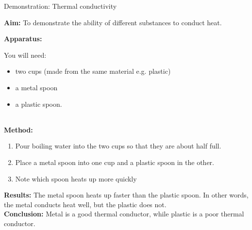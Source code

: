             \begin{g_experiment}{Demonstration: Thermal conductivity}{
            \nopagebreak
            \label{m38706*id66568}\noindent{}\textbf{Aim: } To demonstrate the ability of different substances to conduct heat.\par 
      \label{m38706*id66588}\noindent{}\textbf{Apparatus: }\\
\begin{minipage}{.5\textwidth}
You will need:
\begin{itemize}
 \item two cups (made from the same material e.g. plastic)
\item a metal spoon
\item a plastic spoon.
\end{itemize} 
\end{minipage}
\begin{minipage}{.5\textwidth}
    \begin{center}
    \end{center}
\end{minipage}\newline \\
      \label{m38706*id66592}\textbf{Method:}
\label{m38706*id66609}\begin{enumerate}[noitemsep, label=\textbf{\arabic*}.]
\label{m38706*uid102}\item Pour boiling water into the two cups so that they are about half full.
\label{m38706*uid103}\item Place a metal spoon into one cup and a plastic spoon in the other.
\label{m38706*uid104}\item Note which spoon heats up more quickly
\end{enumerate}
        \par 
\label{m38706*eip-270}
      \label{m38706*id66666}\noindent{}\textbf{Results: } The metal spoon heats up faster than the plastic spoon. In other words, the metal conducts heat well, but the plastic does not.\\
\label{m38706*id66687}\noindent{}\textbf{Conclusion: } Metal is a good thermal conductor, while plastic is a poor thermal conductor.}
\end{g_experiment}
